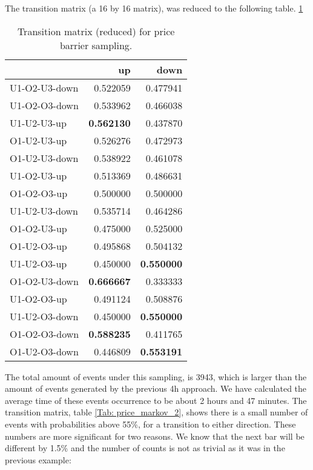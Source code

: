 The transition matrix (a 16 by 16 matrix), was reduced to the following table. \ref{Tab: price_markov}

\begin{table}[H]
\caption{Transition matrix (reduced) for price barrier sampling.}
\centering
\begin{tabular}{lrr}
\toprule
{} &        up &      down \\
\midrule
U1-O2-U3-down &  0.522059 &  0.477941 \\
U1-O2-O3-down &  0.533962 &  0.466038 \\
U1-U2-U3-up   &  \textbf{0.562130} &  0.437870 \\
O1-U2-U3-up   &  0.526276 &  0.472973 \\
O1-U2-U3-down &  0.538922 &  0.461078 \\
U1-O2-U3-up   &  0.513369 &  0.486631 \\
O1-O2-O3-up   &  0.500000 &  0.500000 \\
U1-U2-U3-down &  0.535714 &  0.464286 \\
O1-O2-U3-up   &  0.475000 &  0.525000 \\
O1-U2-O3-up   &  0.495868 &  0.504132 \\
U1-U2-O3-up   &  0.450000 &  \textbf{0.550000} \\
O1-O2-U3-down &  \textbf{0.666667} &  0.333333 \\
U1-O2-O3-up   &  0.491124 &  0.508876 \\
U1-U2-O3-down &  0.450000 &  \textbf{0.550000} \\
O1-O2-O3-down &  \textbf{0.588235} &  0.411765 \\
O1-U2-O3-down &  0.446809 &  \textbf{0.553191} \\
\bottomrule
\end{tabular}
\label{Tab: price_markov}
\end{table}


The total amount of events under this sampling, is 3943, which is larger than the amount of events generated by the previous 4h approach. We have calculated the average time of these events occurrence to be about 2 hours and 47 minutes. The transition matrix, table \ref{Tab: price_markov_2}, shows there is a small number of events with probabilities above 55\%, for a transition to either direction. These numbers are more significant for two reasons. We know that the next bar will be different by 1.5\% and the number of counts is not as trivial as it was in the previous example:



